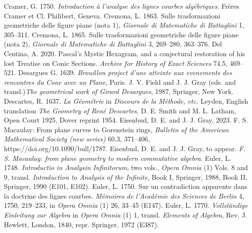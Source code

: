 \newline\indent Cramer, G. 1750. \emph{Introduction \`a l'analyse des lignes courbes alg\'ebriques}. Fr\`eres Cramer et Cl. Philibert, Geneva.
\newline\indent Cremona, L. 1863. Sulle trasformazioni geometriche delle figure
piane (nota 1), \emph{Giornale di Matematiche di Battaglini} 1, 305--311.
\newline\indent Cremona, L. 1865. Sulle trasformazioni geometriche delle figure
piane (nota 2), \emph{Giornale di Matematiche di Battaglini} 3, 269--280, 363--376.
\newline\indent Del Centina, A. 2020. Pascal's Mystic Hexagram, and a conjectural restoration of his lost Treatise on Conic Sections. \emph{Archive for History of Exact Sciences} 74.5, 469--521.
\newline\indent Desargues G. 1639. \emph{Brouillon project d'une atteinte aux evenements des rencontres du Cone avec un Plane}, Paris.  J. V. Field  and J. J. Gray (eds. and transl.)\emph{The geometrical work of Girard Desargues}, 1987, Springer, New York.
\newline\indent Descartes, R. 1637. \emph{La G\'eom\'etrie} in \emph{Discours de la M\'ethode, etc.} Leyden, English translation \emph{The Geometry of Ren\'e Descartes}, D. E. Smith and M. L. Latham, Open Court 1925, Dover reprint 1954.
\newline\indent Eisenbud, D. E. and J. J. Gray, 2023. F. S. Macaulay: From plane curves to Gorenstein rings, \emph{Bulletin  of the American Mathematical Society (new series)} 
60.3,  371--406, https://doi.org/10.1090/bull/1787.
\newline\indent Eisenbud, D. E. and J. J. Gray, to appear. \emph{F. S. Macaulay: from plane geometry to modern commutative algebra}.
\newline\indent  Euler, L. 1748. \emph{Introductio in Analysin Infinitorum}, two vols., \emph{Opera Omnia} (1) Vols. 8 and 9, transl. \emph{Introduction to Analysis of the Infinite}, Book I,  Springer, 1988, Book II, Springer, 1990 (E101, E102).
\newline\indent  Euler, L. 1750.  Sur un contradiction apparente dans la doctrine des lignes courbes. \emph{M\'emoires de l'Acad\'emie des Sciences de Berlin} 4, 1750, 219--233, in  \emph{Opera Omnia} (1)   26, 33--45 (E147).
\newline\indent Euler, L. 1770. \emph{Vollst\"andige Einleitung zur Algebra} in \emph{Opera Omnia} (1) 1,  transl. \emph{Elements of Algebra}, Rev. J. Hewlett, London, 1840, repr.  Springer, 1972 (E387).
